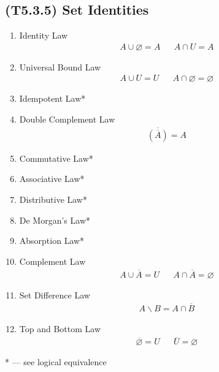 \documentclass[landscape, a4paper]{article}
\newcommand{\customsection}[1]{%
    \vspace*{-16pt}%
    \section*{#1}%
    \vspace*{-5pt}%
}
\begin{document}
\begin{multicols*}{4}
    \customsection{(T5.3.5) Set Identities}
    \begin{enumerate}[wide, labelindent=2pt]
        \item Identity Law
              \begin{align*}
                  A \cup \varnothing = A &  & A\cap U = A
              \end{align*}
        \item Universal Bound Law
              \begin{align*}
                  A \cup U = U &  & A \cap \varnothing = \varnothing
              \end{align*}
        \item Idempotent Law*
        \item Double Complement Law
              \begin{align*}
                  \overline{(\overline{A})}=A
              \end{align*}
        \item Commutative Law*
        \item Associative Law*
        \item Distributive Law*
        \item De Morgan's Law*
        \item Absorption Law*
        \item Complement Law
              \begin{align*}
                  A\cup \overline{A}=U &  & A\cap \overline{A}=\varnothing
              \end{align*}
        \item Set Difference Law
              \begin{align*}
                  A\backslash B=A\cap \overline{B}
              \end{align*}
        \item Top and Bottom Law
              \begin{align*}
                  \overline{\varnothing}=U &  & \overline{U}=\varnothing
              \end{align*}
    \end{enumerate}
    * --- see logical equivalence


\end{multicols*}
\end{document}
